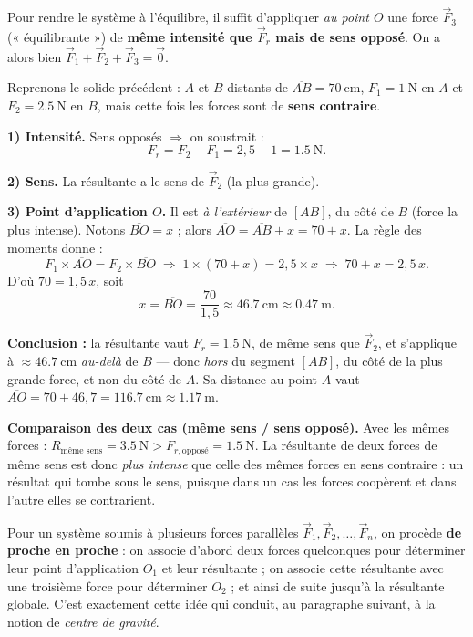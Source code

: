 \documentclass[11pt,a4paper]{article}
\newcommand{\vv}[1]{\vec{#1}}
\begin{document}
\begin{remarque}
Pour rendre le système à l'équilibre, il suffit d'appliquer \emph{au point $O$} une force $\vv F_3$
(« équilibrante ») de \textbf{même intensité que $\vv F_r$ mais de sens opposé}. On a alors bien
$\vv F_1 + \vv F_2 + \vv F_3 = \vv 0$.
\end{remarque}

\begin{exemple}
Reprenons le solide précédent : $A$ et $B$ distants de $\overline{AB}=\SI{70}{\centi\metre}$,
$F_1=\SI{1}{\newton}$ en $A$ et $F_2=\SI{2.5}{\newton}$ en $B$, mais cette fois les forces sont de
\textbf{sens contraire}.

\smallskip
\textbf{1) Intensité.} Sens opposés $\Rightarrow$ on soustrait :
\[
F_r = F_2 - F_1 = 2{,}5 - 1 = \SI{1.5}{\newton}.
\]

\textbf{2) Sens.} La résultante a le sens de $\vv F_2$ (la plus grande).

\textbf{3) Point d'application $O$.} Il est \emph{à l'extérieur} de $[AB]$, du côté de $B$ (force la plus
intense). Notons $\overline{BO}=x$ ; alors $\overline{AO}=\overline{AB}+x = 70+x$. La règle des moments donne :
\[
F_1\times\overline{AO} = F_2\times\overline{BO}
\;\Longrightarrow\; 1\times(70+x) = 2{,}5\times x
\;\Longrightarrow\; 70 + x = 2{,}5\,x.
\]
D'où $70 = 1{,}5\,x$, soit
\[
x = \overline{BO} = \frac{70}{1{,}5} \approx \SI{46.7}{\centi\metre}\approx\SI{0.47}{\metre}.
\]

\textbf{Conclusion :} la résultante vaut $F_r = \SI{1.5}{\newton}$, de même sens que $\vv F_2$, et
s'applique à $\approx\SI{46.7}{\centi\metre}$ \emph{au-delà} de $B$ — donc \emph{hors} du segment
$[AB]$, du côté de la plus grande force, et non du côté de $A$. Sa distance au point $A$ vaut
$\overline{AO}=70+46{,}7 = \SI{116.7}{\centi\metre}\approx\SI{1.17}{\metre}$.

\smallskip
\textbf{Comparaison des deux cas (même sens / sens opposé).} Avec les mêmes forces :
$R_{\text{même sens}} = \SI{3.5}{\newton} > F_{r,\text{opposé}} = \SI{1.5}{\newton}$. La résultante de
deux forces de même sens est donc \emph{plus intense} que celle des mêmes forces en sens
contraire : un résultat qui tombe sous le sens, puisque dans un cas les forces coopèrent et dans
l'autre elles se contrarient.
\end{exemple}

\begin{remarque}
Pour un système soumis à plusieurs forces parallèles $\vv F_1, \vv F_2, \dots, \vv F_n$, on procède
\textbf{de proche en proche} : on associe d'abord deux forces quelconques pour déterminer leur
point d'application $O_1$ et leur résultante ; on associe cette résultante avec une troisième force
pour déterminer $O_2$ ; et ainsi de suite jusqu'à la résultante globale. C'est exactement cette idée
qui conduit, au paragraphe suivant, à la notion de \emph{centre de gravité}.
\end{remarque}
\end{document}
